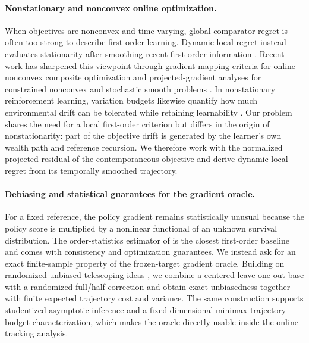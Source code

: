 \paragraph{Nonstationary and nonconvex online optimization.}
When objectives are nonconvex and time varying, global comparator regret is often too strong to describe first-order learning.  Dynamic local regret instead evaluates stationarity after smoothing recent first-order information \citep{aydore2019dynamic}.  Recent work has sharpened this viewpoint through gradient-mapping criteria for online nonconvex composite optimization \citep{hallak2025sound} and projected-gradient analyses for constrained nonconvex and stochastic smooth problems \citep{lan2026projected}.  In nonstationary reinforcement learning, variation budgets likewise quantify how much environmental drift can be tolerated while retaining learnability \citep{feng2023nonstationary}.  Our problem shares the need for a local first-order criterion but differs in the origin of nonstationarity: part of the objective drift is generated by the learner's own wealth path and reference recursion.  We therefore work with the normalized projected residual of the contemporaneous \CPT objective and derive dynamic local regret from its temporally smoothed trajectory.

\paragraph{Debiasing and statistical guarantees for the gradient oracle.}
For a fixed reference, the \CPT policy gradient remains statistically unusual because the policy score is multiplied by a nonlinear functional of an unknown survival distribution.  The order-statistics estimator of \citet{lepel2026policygradients} is the closest first-order baseline and comes with consistency and optimization guarantees.  We instead ask for an exact finite-sample property of the frozen-target gradient oracle.  Building on randomized unbiased telescoping ideas \citep{rhee2015unbiased}, we combine a centered leave-one-out base with a randomized full/half correction and obtain exact unbiasedness together with finite expected trajectory cost and variance.  The same construction supports studentized asymptotic inference and a fixed-dimensional minimax trajectory-budget characterization, which makes the oracle directly usable inside the online tracking analysis.

